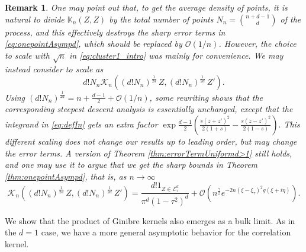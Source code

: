 \documentclass[%
 jmp,
cp,  %
 amsmath,amsthm,amssymb,%
 reprint,%
onecolumn]{revtex4-2}
\newtheorem{proposition}[theorem]{Proposition}
\newtheorem{remark}[theorem]{Remark}
\begin{document}
\begin{remark}
One may point out that, to get the average density of points, it is natural to divide $\mathbb K_n(Z, Z)$ by the total number of points $N_n = \binom{n+d-1}{d}$ of the process, and this effectively destroys the sharp error terms in \eqref{eq:onepointAsympd}, which should be replaced by $\mathcal O(1/n)$. However, the choice to scale with $\sqrt n$ in \eqref{eq:cluster1_intro} was mainly for convenience. We may instead consider to scale as
$$d! N_n \mathcal K_n\left((d! N_n)^\frac{1}{2d} \, Z, (d! N_n)^\frac{1}{2d}\, Z' \right).$$
Using $(d! N_n)^\frac{1}{2d} = n + \frac{d-1}{2} + \mathcal O(1/n)$, some rewriting shows that the corresponding steepest descent analysis is essentially unchanged, except that the integrand in \eqref{eq:defIn} gets an extra factor 
$
\exp{\frac{d-1}{2} \left(\frac{s(z+z')^2}{2(1+s)}-\frac{s (z-z')^2}{2(1-s)}\right)}.
$
This different scaling does not change our results up to leading order, but may change the error terms. A version of Theorem \ref{thm:errorTermUniformd>1} still holds, and one may use it to argue that we get the sharp bounds in Theorem \ref{thm:onepointAsympd}, that is, as $n\to\infty$
$$
\mathcal K_n\left((d! N_n)^\frac{1}{2d} \, Z, (d! N_n)^\frac{1}{2d}\, Z' \right) 
= \frac{d! \mathfrak{1}_{Z\in \mathcal E_\tau^d}}{\pi^d (1-\tau^2)^d} 
+ \mathcal O\left(n^{\frac{\gamma}{2}} e^{-2 n (\xi-\xi_\tau)^2 g(\xi+i\eta)}\right).
$$
\end{remark}



We show that the product of Ginibre kernels also emerges as a bulk limit. As in the $d=1$ case, we have a more general asymptotic behavior for the correlation kernel. 

\end{document}
